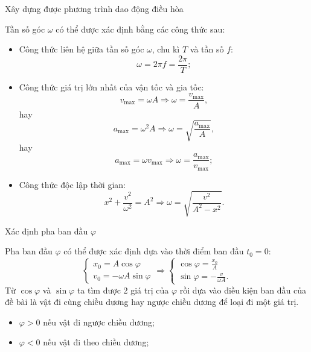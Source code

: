 \begin{dang}{Xây dựng được phương trình dao động điều hòa}
{\begin{description}
			Tần số góc $\omega$ có thể được xác định bằng các công thức sau:
			\begin{itemize}
				\item Công thức liên hệ giữa tần số góc $\omega$, chu kì $T$ và tần số $f$:
				\begin{equation*}
					\omega=2\pi f=\dfrac{2\pi}{T};
				\end{equation*}
				\item Công thức giá trị lớn nhất của vận tốc và gia tốc:
				\begin{equation*}
					v_\text{max}=\omega A\Rightarrow \omega=\dfrac{v_\text{max}}{A},
				\end{equation*}
				hay
				\begin{equation*}
					a_\text{max}=\omega^2 A\Rightarrow \omega=\sqrt{\dfrac{a_\text{max}}{A}},
				\end{equation*}
				hay
				\begin{equation*}
					a_\text{max}=\omega v_\text{max}\Rightarrow \omega=\dfrac{a_\text{max}}{v_\text{max}};
				\end{equation*}
				\item Công thức độc lập thời gian:
				\begin{equation*}
					x^2+\dfrac{v^2}{\omega^2}=A^2 \Rightarrow \omega=\sqrt{\dfrac{v^2}{A^2-x^2}}.
				\end{equation*}
			\end{itemize}
			\item[Bước 3:] Xác định pha ban đầu $\varphi$
			
			Pha ban đầu $\varphi$ có thể được xác định dựa vào thời điểm ban đầu $t_0=0$:
			\begin{equation*}
				\left\{
				\begin{matrix}
					x_0=A\cos\varphi\\
					v_0=-\omega A\sin\varphi
				\end{matrix}
				\right.
				\Rightarrow
				\left\{
				\begin{matrix}
					\cos\varphi=\frac{x_0}{A}\\
					\sin\varphi=-\frac{v}{\omega A}.
				\end{matrix}
				\right.
			\end{equation*}
			Từ $\cos\varphi$ và $\sin\varphi$ ta tìm được 2 giá trị của $\varphi$ rồi dựa vào điều kiện ban đầu của đề bài là vật đi cùng chiều dương hay ngược chiều dương để loại đi một giá trị.
			\begin{itemize}
				\item $\varphi>0$ nếu vật đi ngược chiều dương;
				\item $\varphi<0$ nếu vật đi theo chiều dương;
			\end{itemize}
		\end{description}
		
}
\end{dang}
